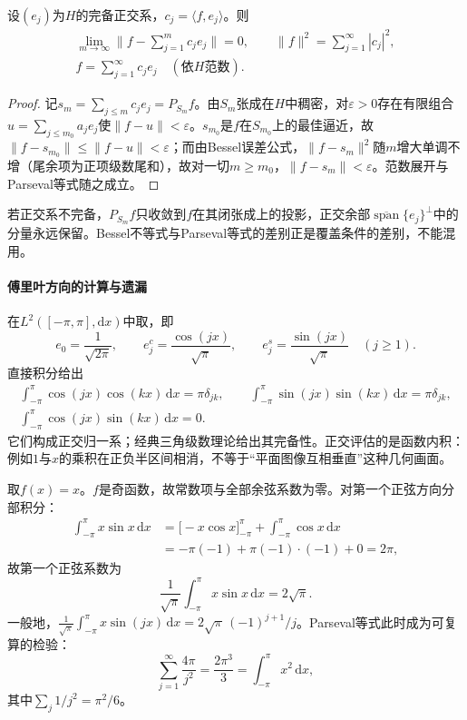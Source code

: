 \begin{theorem}[完备正交系与Parseval等式]
\label{thm:parseval}
设$(e_j)$为$H$的完备正交系，$c_j=\langle f,e_j\rangle$。则
\[
\begin{aligned}
\lim_{m\to\infty}\|f-\sum_{j=1}^m c_je_j\|=0,
\qquad
\|f\|^2=\sum_{j=1}^\infty|c_j|^2,\\
f=\sum_{j=1}^\infty c_je_j\quad(\text{依}H\text{范数}).
\end{aligned}
\]
\end{theorem}

\begin{proof}
记$s_m=\sum_{j\le m}c_je_j=P_{S_m}f$。由$S_m$张成在$H$中稠密，对$\varepsilon>0$存在有限组合$u=\sum_{j\le m_0}a_je_j$使$\|f-u\|<\varepsilon$。$s_{m_0}$是$f$在$S_{m_0}$上的最佳逼近，故$\|f-s_{m_0}\|\le\|f-u\|<\varepsilon$；而由Bessel误差公式，$\|f-s_m\|^2$随$m$增大单调不增（尾余项为正项级数尾和），故对一切$m\ge m_0$，$\|f-s_m\|<\varepsilon$。范数展开与Parseval等式随之成立。
\end{proof}

若正交系不完备，$P_{S_m}f$只收敛到$f$在其闭张成上的投影，正交余部$\overline{\operatorname{span}}\{e_j\}^\perp$中的分量永远保留。Bessel不等式与Parseval等式的差别正是覆盖条件的差别，不能混用。

\paragraph{傅里叶方向的计算与遗漏}

在$L^2([-\pi,\pi],\mathrm dx)$中取，即
\[
e_0=\frac1{\sqrt{2\pi}},\qquad
e_j^c=\frac{\cos(jx)}{\sqrt\pi},\qquad
e_j^s=\frac{\sin(jx)}{\sqrt\pi}\quad(j\ge1).
\]
直接积分给出
\[
\begin{aligned}
\int_{-\pi}^{\pi}\cos(jx)\cos(kx)\,\mathrm dx=\pi\delta_{jk},
\qquad
\int_{-\pi}^{\pi}\sin(jx)\sin(kx)\,\mathrm dx=\pi\delta_{jk},\\
\int_{-\pi}^{\pi}\cos(jx)\sin(kx)\,\mathrm dx=0.
\end{aligned}
\]
它们构成正交归一系；经典三角级数理论给出其完备性。正交评估的是函数内积：例如$1$与$x$的乘积在正负半区间相消，不等于“平面图像互相垂直”这种几何画面。

取$f(x)=x$。$f$是奇函数，故常数项与全部余弦系数为零。对第一个正弦方向分部积分：
\[
\begin{aligned}
\int_{-\pi}^{\pi}x\sin x\,\mathrm dx
&=\bigl[-x\cos x\bigr]_{-\pi}^{\pi}+\int_{-\pi}^{\pi}\cos x\,\mathrm dx\\
&=-\pi(-1)+\pi(-1)\cdot(-1)+0=2\pi,
\end{aligned}
\]
故第一个正弦系数为
\[
\frac1{\sqrt\pi}\int_{-\pi}^{\pi}x\sin x\,\mathrm dx=2\sqrt\pi.
\]
一般地，$\frac1{\sqrt\pi}\int_{-\pi}^{\pi}x\sin(jx)\,\mathrm dx=2\sqrt\pi\,(-1)^{j+1}/j$。Parseval等式此时成为可复算的检验：
\[
\sum_{j=1}^\infty\frac{4\pi}{j^2}=\frac{2\pi^3}{3}=\int_{-\pi}^{\pi}x^2\,\mathrm dx,
\]
其中$\sum_j1/j^2=\pi^2/6$。

